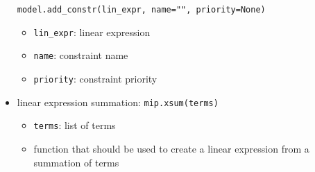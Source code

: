 \documentclass[english]{article}
\begin{document}
\begin{itemize}
        \begin{verbatim}
model.add_constr(lin_expr, name="", priority=None)
  \end{verbatim}
        \begin{itemize}
          \item \texttt{lin\_expr}: linear expression
          \item \texttt{name}: constraint name
          \item \texttt{priority}: constraint priority
        \end{itemize}
  \item linear expression summation: \texttt{mip.xsum(terms)}
        \begin{itemize}
          \item  \texttt{terms}: list of terms
          \item function that should be used to create a linear expression from a summation of terms
        \end{itemize}
\end{itemize}
\end{document}
